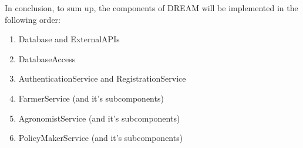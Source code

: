 In conclusion, to sum up, the components of DREAM will be implemented in the following order:
\begin{enumerate}
  \item Database and ExternalAPIs
  \item DatabaseAccess
  \item AuthenticationService and RegistrationService
  \item FarmerService (and it's subcomponents)
  \item AgronomistService (and it's subcomponents)
  \item PolicyMakerService (and it's subcomponents)
\end{enumerate}